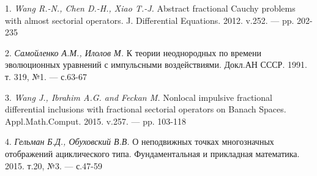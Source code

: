 \litlist

1. {\it Wang R.-N., Chen D.-H., Xiao T.-J.} Abstract fractional Cauchy problems with almost sectorial operators. J. Differential Equations. 2012. v.252. — pp. 202-235

2. {\it Самойленко А.М., Илолов М.} К теории неоднородных по времени эволюционных уравнений с импульсными воздействиями. Докл.АН СССР. 1991. т. 319, №1. — с.63-67

3. {\it Wang J., Ibrahim A.G. and Feckan M.} Nonlocal impulsive fractional differential inclusions with fractional sectorial operators on Banach Spaces. Appl.Math.Comput. 2015. v.257. — pp. 103-118

4. {\it Гельман Б.Д., Обуховский В.В.} О неподвижных точках многозначных отображений ациклического типа. Фундаментальная и прикладная математика. 2015. т.20, №3. — с.47-59
